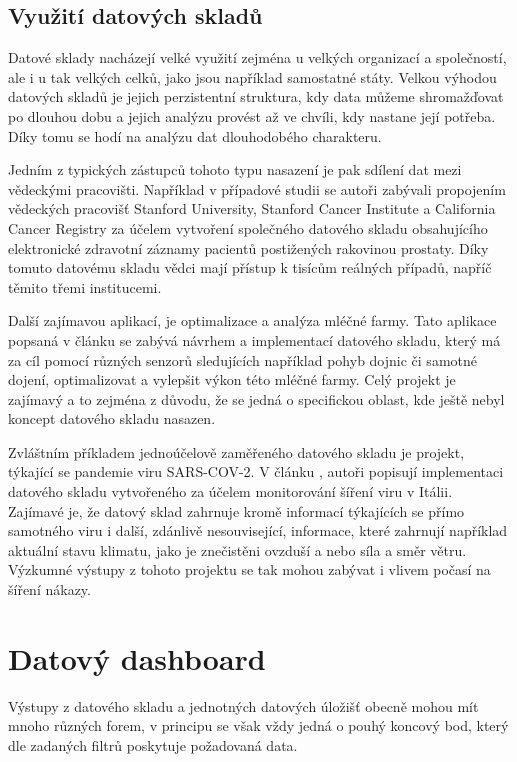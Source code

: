\documentclass[
  digital,     %
  twoside,     %
  lof,         %
  lot,         %
]{fithesis4}
\begin{document}
\subsection{Využití datových skladů}
Datové sklady nacházejí velké využití zejména u velkých organizací a společností, ale i u tak velkých celků, jako jsou například samostatné státy. Velkou výhodou datových skladů je jejich perzistentní struktura, kdy data můžeme shromažďovat po dlouhou dobu a jejich analýzu provést až ve chvíli, kdy nastane její potřeba. Díky tomu se hodí na analýzu dat dlouhodobého charakteru.

Jedním z typických zástupců tohoto typu nasazení je pak sdílení dat mezi vědeckými pracovišti. Například v případové studii  \parencite{Seneviratne20180124} se autoři zabývali propojením vědeckých pracovišť Stanford University, Stanford Cancer Institute a California Cancer Registry za účelem vytvoření společného datového skladu obsahujícího elektronické zdravotní záznamy pacientů postižených rakovinou prostaty. Díky tomuto datovému skladu vědci mají přístup k tisícům reálných případů, napříč těmito třemi institucemi.

Další zajímavou aplikací, je optimalizace a analýza mléčné farmy. Tato aplikace popsaná v článku  \parencite{Schuetz20180326} se zabývá návrhem a implementací datového skladu, který má za cíl pomocí různých senzorů sledujících například pohyb dojnic či samotné dojení, optimalizovat a vylepšit výkon této mléčné farmy. Celý projekt je  zajímavý a to zejména z důvodu, že se jedná o specifickou oblast, kde ještě nebyl koncept datového skladu nasazen.

Zvláštním příkladem jednoúčelově zaměřeného datového skladu je projekt, týkající se pandemie viru SARS-COV-2. V článku  \parencite{Agapito2020}, autoři popisují implementaci datového skladu vytvořeného za účelem monitorování šíření viru v Itálii. Zajímavé je, že datový sklad zahrnuje kromě informací týkajících se přímo samotného viru i další, zdánlivě nesouvisející, informace, které zahrnují například aktuální stavu klimatu, jako je znečistěni ovzduší a nebo síla a směr větru. Výzkumné výstupy z tohoto projektu se tak mohou zabývat i vlivem počasí na šíření nákazy. 

\section{Datový dashboard}
Výstupy z datového skladu a jednotných datových úložišť obecně mohou mít mnoho různých forem, v principu se však vždy jedná o pouhý koncový bod, který dle zadaných filtrů poskytuje požadovaná data.
\end{document}
